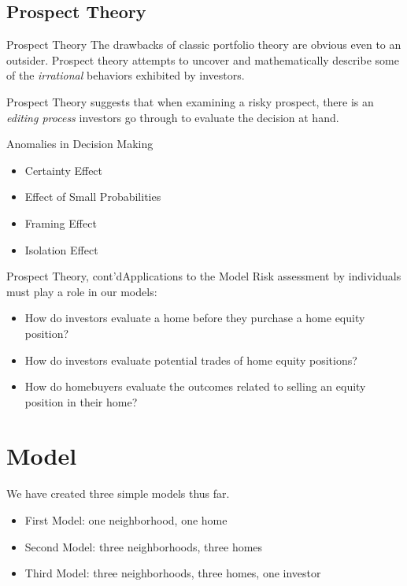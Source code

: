 \documentclass{beamer}
\newcommand{\hep}{home equity position}
\begin{document}
\subsection{Prospect Theory}
\begin{frame}{Prospect Theory}
The drawbacks of classic portfolio theory are obvious even to an outsider. Prospect theory attempts to uncover and mathematically describe some of the \emph{irrational} behaviors exhibited by investors.\bigskip

\pause
Prospect Theory suggests that when examining a risky prospect, there is an \emph{editing process} investors go through to evaluate the decision at hand.
\end{frame}

\begin{frame}{Anomalies in Decision Making}
\begin{itemize}
\pause
\item
Certainty Effect
\pause
\item
Effect of Small Probabilities
\pause
\item
Framing Effect 
\pause
\item
Isolation Effect

\end{itemize}
\end{frame}


\begin{frame}{Prospect Theory, cont'd}{Applications to the Model}
\pause
Risk assessment by individuals must play a role in our models:
\pause
\begin{itemize}
\item
How do investors evaluate a home before they purchase a \hep ?
\pause
\item
How do investors evaluate potential trades of \hep s?
\pause
\item
How do homebuyers evaluate the outcomes related to selling an equity position in their home?
\end{itemize}
\end{frame}


\section{Model}

\begin{frame}
We have created three simple models thus far.
\pause
\begin{itemize}
\pause
\item
First Model: one neighborhood, one home
\pause
\item
Second Model: three neighborhoods, three homes
\pause
\item
Third Model: three neighborhoods, three homes, one investor
\end{itemize}
\end{frame}
\end{document}

